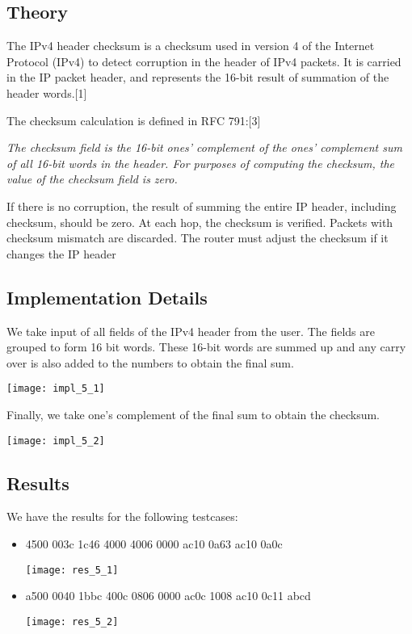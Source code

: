 \documentclass[11pt,a4paper]{article}
\begin{document}
\subsection{Theory}\label{sec:theory5}
The IPv4 header checksum is a checksum used in version 4 of the Internet Protocol (IPv4) to detect corruption in the header of IPv4 packets. It is carried in the IP packet header, and represents the 16-bit result of summation of the header words.[1]

The checksum calculation is defined in RFC 791:[3]

\emph{The checksum field is the 16-bit ones' complement of the ones' complement sum of all 16-bit words in the header. For purposes of computing the checksum, the value of the checksum field is zero.}

If there is no corruption, the result of summing the entire IP header, including checksum, should be zero. At each hop, the checksum is verified. Packets with checksum mismatch are discarded. The router must adjust the checksum if it changes the IP header

\subsection{Implementation Details}\label{sec:details5}

We take input of all fields of the IPv4 header from the user. The fields are grouped to form 16 bit words. These 16-bit words are summed up and any carry over is also added to the numbers to obtain the final sum.

\texttt{[image: impl\_5\_1]}

Finally, we take one's complement of the final sum to obtain the checksum.

\texttt{[image: impl\_5\_2]}

\subsection{Results}\label{sec:results5}
We have the results for the following testcases:
\begin{itemize}
    \item 4500 003c 1c46 4000 4006 0000 ac10 0a63 ac10 0a0c
    
    \texttt{[image: res\_5\_1]}
    
    \hspace{1 pt}
    
    \item a500 0040 1bbc 400c 0806 0000 ac0c 1008 ac10 0c11 abcd
    
    \texttt{[image: res\_5\_2]}
    
\end{itemize}
\end{document}

